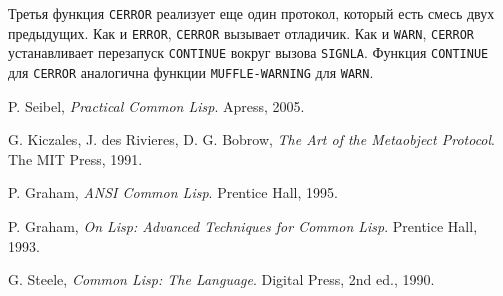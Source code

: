 Третья функция \lstinline{CERROR} реализует еще один протокол, который есть смесь двух предыдущих. Как и \lstinline{ERROR}, \lstinline{CERROR} вызывает отладичик. Как и \lstinline{WARN}, \lstinline{CERROR} устанавливает перезапуск \lstinline{CONTINUE} вокруг вызова \lstinline{SIGNLA}. Функция \lstinline{CONTINUE} для \lstinline{CERROR} аналогична функции \lstinline{MUFFLE-WARNING} для \lstinline{WARN}.

\begin{thebibliography}{9}

  P. Seibel,
  \emph{Practical Common Lisp}.
  Apress,
  2005.

  G. Kiczales, J. des Rivieres, D. G. Bobrow,
  \emph{The Art of the Metaobject Protocol}.
  The MIT Press,
  1991.

  P. Graham,
  \emph{ANSI Common Lisp}.
  Prentice Hall,
  1995.

  P. Graham,
  \emph{On Lisp: Advanced Techniques for Common Lisp}.
  Prentice Hall,
  1993.

  G. Steele,
  \emph{Common Lisp: The Language}.
  Digital Press,
  2nd ed.,
  1990.

\end{thebibliography}
